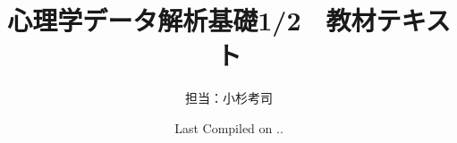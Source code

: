 \documentclass{ltjsbook}
\begin{document}
\title{心理学データ解析基礎1/2　教材テキスト}
\author{担当：小杉考司}
\date{Last Compiled on \number\year .\number\month .\number\day}
\maketitle
\setcounter{tocdepth}{1}
\tableofcontents
\linenumbers






























\nolinenumbers


\printindex
\end{document}
